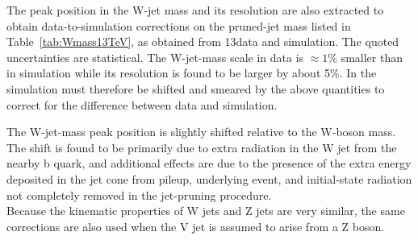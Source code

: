 The peak position in the W-jet mass and its resolution are also extracted to obtain data-to-simulation corrections on the pruned-jet mass listed in Table~\ref{tab:Wmass13TeV}, as obtained from 13\TeV data and simulation. The quoted uncertainties are statistical. The W-jet-mass scale in data is $\approx1\%$ smaller than in simulation while its resolution is found to be larger by about 5\%.
In the simulation \mJ must therefore be shifted and smeared by the above quantities to correct for the difference between data and simulation.

The W-jet-mass peak position is slightly shifted relative to the W-boson mass. The shift is found to be primarily due to extra radiation in the W jet from the nearby b quark, and additional effects are due to the presence of the extra energy deposited in the jet cone from pileup, underlying event, and initial-state radiation not completely removed in the jet-pruning procedure.\\

Because the kinematic properties of W jets and Z jets are very similar, the same corrections are also used when the V jet is assumed to arise from a Z boson.

